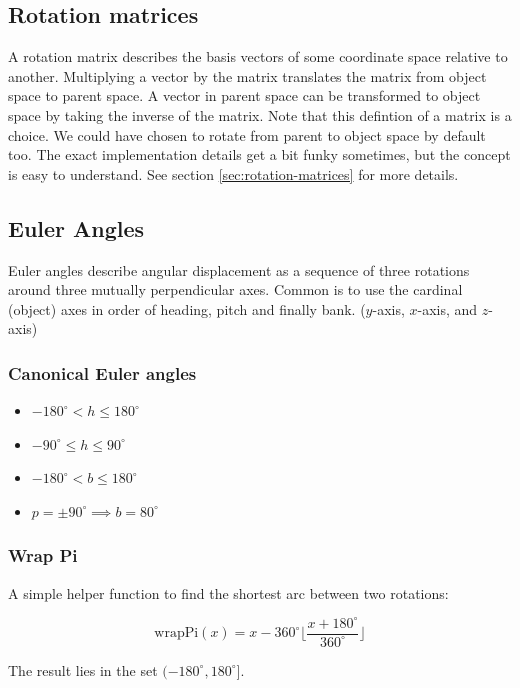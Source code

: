 \documentclass[a4paper,11pt]{article}
\begin{document}
\subsection{Rotation matrices}

A rotation matrix describes the basis vectors of some coordinate space relative to another. Multiplying a vector by the matrix translates the matrix from object space to parent space. A vector in parent space can be transformed to object space by taking the inverse of the matrix. Note that this defintion of a matrix is a choice. We could have chosen to rotate from parent to object space by default too. The exact implementation details get a bit funky sometimes, but the concept is easy to understand. See section \ref{sec:rotation-matrices} for more details.

\subsection{Euler Angles}

Euler angles describe angular displacement as a sequence of three rotations around three mutually perpendicular axes. Common is to use the cardinal (object) axes in order of heading, pitch and finally bank. ($y$-axis, $x$-axis, and $z$-axis)

\subsubsection{Canonical Euler angles}

\begin{itemize}
	\item $-180^\circ < h \leq 180^\circ$
	\item $-90^\circ \leq h \leq 90^\circ$
	\item $-180^\circ < b \leq 180^\circ$
	\item $p=\pm 90^\circ \implies b=80^\circ$
\end{itemize}

\subsubsection{Wrap Pi}

A simple helper function to find the shortest arc between two rotations:

$$\text{wrapPi}(x)=x-360^\circ \lfloor \frac{x+180^\circ}{360^\circ} \rfloor$$

\noindent The result lies in the set $(-180^\circ,180^\circ]$.
\end{document}
